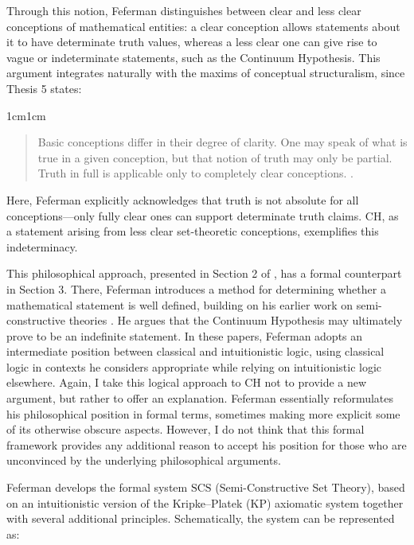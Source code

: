 \documentclass[11pt,a4paper]{article}
\theoremstyle{plain}
\begin{document}
Through this notion, Feferman distinguishes between clear and less clear conceptions of mathematical entities: a clear conception allows statements about it to have determinate truth values, whereas a less clear one can give rise to vague or indeterminate statements, such as the Continuum Hypothesis. This argument integrates naturally with the maxims of conceptual structuralism, since Thesis 5 states:

\begin{adjustwidth}{1cm}{1cm}
\begin{quote}
\small
Basic conceptions differ in their degree of clarity. One may speak of what is true in a given conception, but that notion of truth may only be partial. Truth in full is applicable only to completely clear conceptions. \parencite[p. 11]{Feferman2011a}.
\end{quote}
\end{adjustwidth}

Here, Feferman explicitly acknowledges that truth is not absolute for all conceptions---only fully clear ones can support determinate truth claims. CH, as a statement arising from less clear set-theoretic conceptions, exemplifies this indeterminacy.

This philosophical approach, presented in Section 2 of \parencite{Feferman2011a}, has a formal counterpart in Section 3. There, Feferman introduces a method for determining whether a mathematical statement is well defined, building on his earlier work on semi-constructive theories \parencite{Feferman2010}. He argues that the Continuum Hypothesis may ultimately prove to be an indefinite statement. In these papers, Feferman adopts an intermediate position between classical and intuitionistic logic, using classical logic in contexts he considers appropriate while relying on intuitionistic logic elsewhere.
Again, I take this logical approach to CH not to provide a new argument, but rather to offer an explanation. Feferman essentially reformulates his philosophical position in formal terms, sometimes making more explicit some of its otherwise obscure aspects. However, I do not think that this formal framework provides any additional reason to accept his position for those who are unconvinced by the underlying philosophical arguments.

Feferman develops the formal system $\mathrm{SCS}$ (Semi-Constructive Set Theory), based on an intuitionistic version of the Kripke–Platek (KP) axiomatic system together with several additional principles. Schematically, the system can be represented as:
\end{document}
